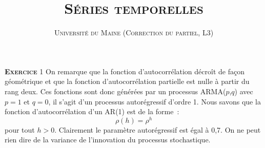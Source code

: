 \documentclass[10pt,a4paper,notitlepage,onecolumn]{article}
\newcommand{\exercice}[1]{\textsc{\textbf{Exercice}} #1}
\begin{document}
\title{\textsc{Séries temporelles}}
\author{\textsc{Université du Maine (Correction du partiel, L3)}}
\date{}


\maketitle

\exercice{1} On remarque que  la fonction d'autocorrélation décroît de
façon géométrique  et que la fonction  d'autocorrélation partielle est
nulle à partir  du rang deux. Ces fonctions sont  donc générées par un
processus ARMA($p$,$q$) avec $p=1$ et  $q=0$, il s'agit d'un processus
autorégressif d'ordre 1. Nous savons que la fonction d'autocorrélation
d'un AR(1) est de la forme :
\[
\rho(h) = \rho^{h}
\]
pour  tout $h>0$.  Clairement le  paramètre autorégressif  est égal  à
0,7. On ne peut rien dire  de la variance de l'innovation du processus
stochastique.\newline

\bigskip
\bigskip
\end{document}
